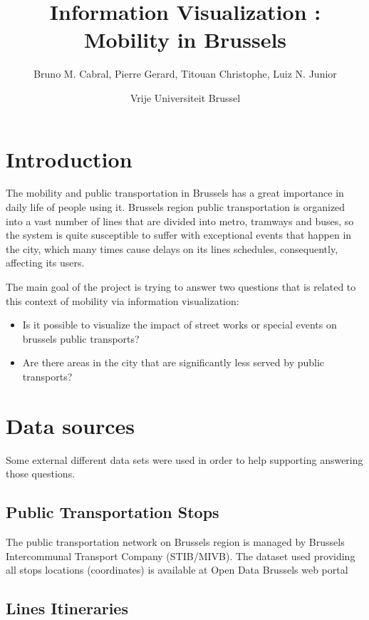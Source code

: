 \documentclass[12pt]{article}%
\begin{document}
\title{Information Visualization : Mobility in Brussels}
\author{Bruno M. Cabral, Pierre Gerard, Titouan Christophe, Luiz N. Junior}
\date{Vrije Universiteit Brussel}
\maketitle


\section{Introduction}
The mobility and public transportation in Brussels has a great importance in daily life of people using it.  Brussels region public transportation is organized into a vast number of lines that are divided into metro, tramways and buses, so the system is quite susceptible to suffer with exceptional events that happen in the city, which many times cause delays on its lines schedules, consequently, affecting its users.

The main goal of the project is trying to answer two questions that is related to this context of mobility via information visualization:

\begin{itemize}
	\item Is it possible to visualize the impact of street works or special events on brussels public transports?
	\item Are there areas in the city that are significantly less served by public transports?
\end{itemize}


\section{Data sources}
Some external different data sets were used in order to help supporting answering those questions. 

\subsection{Public Transportation Stops}

The public transportation network on Brussels region is managed by Brussels Intercommunal Transport Company (STIB/MIVB). The dataset used providing all stops locations (coordinates) is available at Open Data Brussels web portal %

\subsection{Lines Itineraries}
\end{document}
